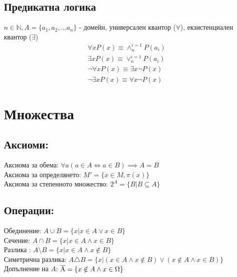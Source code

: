 \documentclass[12pt]{article}
\begin{document}
    \subsection*{Предикатна логика}
    \( n \in \mathbb{N}, A = \{ a_1, a_2, \dots a_n \} \) - домейн, универсален квантор (\( \forall \)), екзистенциален квантор (\( \exists \)) \\
    \begin{gather*}
        \forall x P(x) \equiv \land^{i=1}_{n} P(a_i) \\
        \exists x P(x) \equiv \lor^{i=1}_{n} P(a_i) \\
        \neg \forall x P(x) \equiv \exists x \neg P(x) \\
        \neg \exists x P(x) \equiv \forall x \neg P(x)
    \end{gather*}
    \section{Множества}
    \subsection*{Аксиоми:}
    Аксиома за обема: $ \forall a (a \in A \iff a \in B) \implies A=B $ \\
    Аксиома за определянето: $ M'=\{ x \in M, \pi (x) \} $ \\
    Аксиома за степенното множество: $ 2^A = \{ B | B \subseteq A \} $
    \subsection*{Операции:}
    Обединение: $ A \cup B = \{ x | x \in A \lor x \in B \} $ \\
    Сечение: $ A \cap B = \{ x | x \in A \land x \in B \} $ \\
    Разлика : $ A \setminus B = \{ x | x \in A \land x \notin B \} $ \\
    Симетрична разлика: $ A \triangle B = \{ x | (x \in A \land x \notin B) \lor (x \notin A \land x \in B) \} $
    Допълнение на $ A $: $ \overline{\rm A} = \{ x \notin A \land x \in \Omega \} $
    
\end{document}
